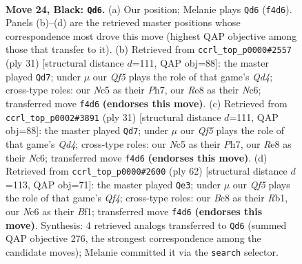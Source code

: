 \documentclass[11pt]{article}
\begin{document}
\clearpage

\begin{figure}[p]\centering
\begin{subfigure}{0.46\textwidth}\centering
\resizebox{\linewidth}{!}{%
\newchessgame
\chessboard[
  setfen={1rb1r1k1/p1p2pp1/2n4p/p1n4P/2P2q2/2P1PQR1/8/R1B1KBN1 b Q - 1 24},
  showmover=false,
  pgfstyle=straightmove, color=movearrow, markmove={f4-d6}
]}
\caption{}
\end{subfigure}\hfill
\begin{subfigure}{0.46\textwidth}\centering
\resizebox{\linewidth}{!}{%
\newchessgame
\chessboard[
  setfen={1r2r1k1/1pp1bppp/p1n5/3q4/3PBP2/2P5/P4P1P/1RBQR1K1 b - - 2 16},
  showmover=false,
  pgfstyle=straightmove, color=movearrow, markmove={d5-d7}
]}
\caption{}
\end{subfigure}
\\[4pt]
\begin{subfigure}{0.46\textwidth}\centering
\resizebox{\linewidth}{!}{%
\newchessgame
\chessboard[
  setfen={1r2r1k1/1pp1bppp/p1n5/3q4/3PBP2/2P5/P4P1P/1RBQR1K1 b - - 2 16},
  showmover=false,
  pgfstyle=straightmove, color=movearrow, markmove={d5-d7}
]}
\caption{}
\end{subfigure}\hfill
\begin{subfigure}{0.46\textwidth}\centering
\resizebox{\linewidth}{!}{%
\newchessgame
\chessboard[
  setfen={k2b1rr1/1pqb4/p1n1p3/1P1pp3/5Q2/P1N2N1P/2R2PP1/1R3BK1 w - - 0 32},
  showmover=false,
  pgfstyle=straightmove, color=movearrow, markmove={f4-e3}
]}
\caption{}
\end{subfigure}
\caption{\textbf{Move 24, Black: \texttt{Qd6}.} (a) Our position; Melanie plays \texttt{Qd6} (\texttt{f4d6}). Panels (b)--(d) are the retrieved master positions whose correspondence most drove this move (highest QAP objective among those that transfer to it). (b) Retrieved from \texttt{ccrl\_top\_p0000\#2557} (ply 31) [structural distance $d$=111, QAP obj=88]: the master played \texttt{Qd7}; under $\mu$ our \emph{Qf5} plays the role of that game's \emph{Qd4}; cross-type roles: our \emph{N}c5 as their \emph{P}h7, our \emph{R}e8 as their \emph{N}c6; transferred move \texttt{f4d6} \textbf{(endorses this move)}. (c) Retrieved from \texttt{ccrl\_top\_p0002\#3891} (ply 31) [structural distance $d$=111, QAP obj=88]: the master played \texttt{Qd7}; under $\mu$ our \emph{Qf5} plays the role of that game's \emph{Qd4}; cross-type roles: our \emph{N}c5 as their \emph{P}h7, our \emph{R}e8 as their \emph{N}c6; transferred move \texttt{f4d6} \textbf{(endorses this move)}. (d) Retrieved from \texttt{ccrl\_top\_p0000\#2600} (ply 62) [structural distance $d$=113, QAP obj=71]: the master played \texttt{Qe3}; under $\mu$ our \emph{Qf5} plays the role of that game's \emph{Qf4}; cross-type roles: our \emph{B}c8 as their \emph{R}b1, our \emph{N}c6 as their \emph{B}f1; transferred move \texttt{f4d6} \textbf{(endorses this move)}. Synthesis: 4 retrieved analogs transferred to \texttt{Qd6} (summed QAP objective 276, the strongest correspondence among the candidate moves); Melanie committed it via the \texttt{search} selector.}
\label{fig:thought-m47}
\end{figure}
\end{document}
